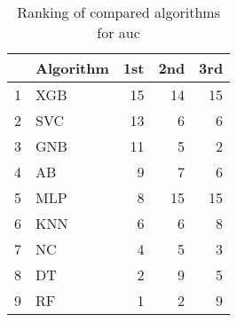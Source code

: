 \begin{table}
\footnotesize
\caption{Ranking of compared algorithms for auc}
\label{tab:places auc}
\begin{tabular}{llrrr}
\hline
 & Algorithm & 1st & 2nd & 3rd \\
\hline
1 & XGB & 15 & 14 & 15 \\
2 & SVC & 13 & 6 & 6 \\
3 & GNB & 11 & 5 & 2 \\
4 & AB & 9 & 7 & 6 \\
5 & MLP & 8 & 15 & 15 \\
6 & KNN & 6 & 6 & 8 \\
7 & NC & 4 & 5 & 3 \\
8 & DT & 2 & 9 & 5 \\
9 & RF & 1 & 2 & 9 \\
\hline
\end{tabular}
\end{table}
